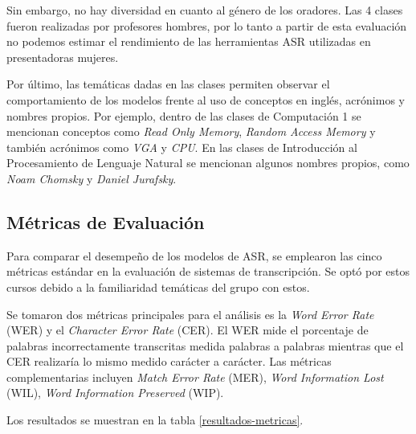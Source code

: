 Sin embargo, no hay diversidad en cuanto al género de los oradores. Las 4 clases fueron realizadas por profesores hombres, por lo tanto a partir de esta evaluación no podemos estimar el rendimiento de las herramientas ASR utilizadas en presentadoras mujeres. 

Por último, las temáticas dadas en las clases permiten observar el comportamiento de los modelos frente al uso de conceptos en inglés, acrónimos y nombres propios. Por ejemplo, dentro de las clases de Computación 1 se mencionan conceptos como \textit{Read Only Memory}, \textit{Random Access Memory} y también acrónimos como \textit{VGA} y \textit{CPU}. En las clases de Introducción al Procesamiento de Lenguaje Natural se mencionan algunos nombres propios, como \textit{Noam Chomsky} y \textit{Daniel Jurafsky}.

\subsection{Métricas de Evaluación}
\label{subsection:6-1-Métricas}

Para comparar el desempeño de los modelos de ASR, se emplearon las cinco métricas estándar en la evaluación de sistemas de transcripción. Se optó por estos cursos debido a la familiaridad temáticas del grupo con estos.

Se tomaron dos métricas principales para el análisis es la \textit{Word Error Rate} (WER) y el \textit{Character Error Rate} (CER). El WER mide el porcentaje de palabras incorrectamente transcritas medida palabras a palabras mientras que el CER realizaría lo mismo medido carácter a carácter. Las métricas complementarias incluyen \textit{Match Error Rate} (MER), \textit{Word Information Lost} (WIL), \textit{Word Information Preserved} (WIP).

Los resultados se muestran en la tabla \ref{resultados-metricas}.

